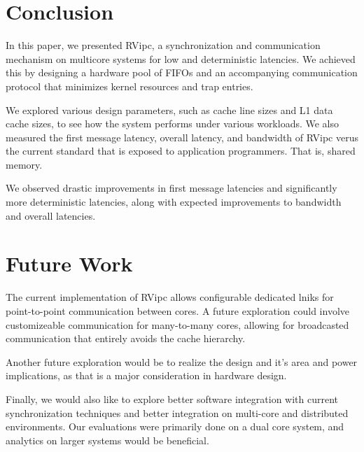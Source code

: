 \section{Conclusion}

In this paper, we presented RVipc, a synchronization and communication mechanism on multicore systems for low and deterministic latencies. We achieved this by designing a hardware pool of FIFOs and an accompanying communication protocol that minimizes kernel resources and trap entries.

We explored various design parameters, such as cache line sizes and L1 data cache sizes, to see how the system performs under various workloads. We also measured the first message latency, overall latency, and bandwidth of RVipc verus the current standard that is exposed to application programmers. That is, shared memory.

We observed drastic improvements in first message latencies and significantly more deterministic latencies, along with expected improvements to bandwidth and overall latencies.

\section{Future Work}

The current implementation of RVipc allows configurable dedicated lniks for point-to-point communication between cores. A future exploration could involve customizeable communication for many-to-many cores, allowing for broadcasted communication that entirely avoids the cache hierarchy.

Another future exploration would be to realize the design and it's area and power implications, as that is a major consideration in hardware design.

Finally, we would also like to explore better software integration with current synchronization techniques and better integration on multi-core and distributed environments. Our evaluations were primarily done on a dual core system, and analytics on larger systems would be beneficial.